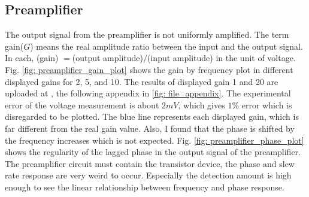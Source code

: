 \documentclass{article}
\begin{document}
\subsection{Preamplifier}
 The output signal from the preamplifier is not uniformly amplified.
 The term gain($G$) means the real amplitude ratio between the input and the output signal.
 In each, (gain) $=$(output amplitude)$/$(input amplitude) in the unit of voltage.
 Fig. \ref{fig: preamplifier_gain_plot} shows the gain by frequency plot in different displayed gains for 2, 5, and 10.
 The results of displayed gain 1 and 20 are uploaded at \cite{github}, the following appendix in \ref{fig: file_appendix}.
 The experimental error of the voltage measurement is about $2mV$, which gives $1\%$ error which is disregarded to be plotted.
 The blue line represents each displayed gain, which is far different from the real gain value.
 Also, I found that the phase is shifted by the frequency increases which is not expected.
 Fig. \ref{fig: preamplifier_phase_plot} shows the regularity of the lagged phase in the output signal of the preamplifier.
 The preamplifier circuit must contain the transistor device, the phase and slew rate response are very weird to occur.
 Especially the detection amount is high enough to see the linear relationship between frequency and phase response.
\end{document}
